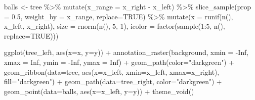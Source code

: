 \documentclass[
]{book}
\newenvironment{Shaded}{\begin{snugshade}}{\end{snugshade}}
\newcommand{\AttributeTok}[1]{\textcolor[rgb]{0.77,0.63,0.00}{#1}}
\newcommand{\ConstantTok}[1]{\textcolor[rgb]{0.00,0.00,0.00}{#1}}
\newcommand{\DecValTok}[1]{\textcolor[rgb]{0.00,0.00,0.81}{#1}}
\newcommand{\FloatTok}[1]{\textcolor[rgb]{0.00,0.00,0.81}{#1}}
\newcommand{\FunctionTok}[1]{\textcolor[rgb]{0.00,0.00,0.00}{#1}}
\newcommand{\NormalTok}[1]{#1}
\newcommand{\OtherTok}[1]{\textcolor[rgb]{0.56,0.35,0.01}{#1}}
\newcommand{\SpecialCharTok}[1]{\textcolor[rgb]{0.00,0.00,0.00}{#1}}
\newcommand{\StringTok}[1]{\textcolor[rgb]{0.31,0.60,0.02}{#1}}
\begin{document}
\begin{Shaded}
\begin{Highlighting}[]
\NormalTok{balls }\OtherTok{\textless{}{-}} 
\NormalTok{  tree }\SpecialCharTok{\%\textgreater{}\%}
  \FunctionTok{mutate}\NormalTok{(}\AttributeTok{x\_range =}\NormalTok{ x\_right }\SpecialCharTok{{-}}\NormalTok{ x\_left) }\SpecialCharTok{\%\textgreater{}\%}
  \FunctionTok{slice\_sample}\NormalTok{(}\AttributeTok{prop =} \FloatTok{0.5}\NormalTok{, }\AttributeTok{weight\_by =}\NormalTok{ x\_range, }\AttributeTok{replace=}\ConstantTok{TRUE}\NormalTok{) }\SpecialCharTok{\%\textgreater{}\%}
  \FunctionTok{mutate}\NormalTok{(}\AttributeTok{x =} \FunctionTok{runif}\NormalTok{(}\FunctionTok{n}\NormalTok{(), x\_left, x\_right),}
         \AttributeTok{size =} \FunctionTok{rnorm}\NormalTok{(}\FunctionTok{n}\NormalTok{(), }\DecValTok{5}\NormalTok{, }\DecValTok{1}\NormalTok{),}
         \AttributeTok{icolor =} \FunctionTok{factor}\NormalTok{(}\FunctionTok{sample}\NormalTok{(}\DecValTok{1}\SpecialCharTok{:}\DecValTok{5}\NormalTok{, }\FunctionTok{n}\NormalTok{(), }\AttributeTok{replace=}\ConstantTok{TRUE}\NormalTok{)))}

\FunctionTok{ggplot}\NormalTok{(tree\_left, }\FunctionTok{aes}\NormalTok{(}\AttributeTok{x=}\NormalTok{x, }\AttributeTok{y=}\NormalTok{y)) }\SpecialCharTok{+} 
  \FunctionTok{annotation\_raster}\NormalTok{(background,}
                    \AttributeTok{xmin =} \SpecialCharTok{{-}}\ConstantTok{Inf}\NormalTok{, }\AttributeTok{xmax =} \ConstantTok{Inf}\NormalTok{,}
                    \AttributeTok{ymin =} \SpecialCharTok{{-}}\ConstantTok{Inf}\NormalTok{, }\AttributeTok{ymax =} \ConstantTok{Inf}\NormalTok{) }\SpecialCharTok{+}
  \FunctionTok{geom\_path}\NormalTok{(}\AttributeTok{color=}\StringTok{"darkgreen"}\NormalTok{) }\SpecialCharTok{+}
  \FunctionTok{geom\_ribbon}\NormalTok{(}\AttributeTok{data=}\NormalTok{tree, }\FunctionTok{aes}\NormalTok{(}\AttributeTok{x=}\NormalTok{x\_left, }\AttributeTok{xmin=}\NormalTok{x\_left, }\AttributeTok{xmax=}\NormalTok{x\_right), }\AttributeTok{fill=}\StringTok{"darkgreen"}\NormalTok{) }\SpecialCharTok{+}
  \FunctionTok{geom\_path}\NormalTok{(}\AttributeTok{data=}\NormalTok{tree\_right, }\AttributeTok{color=}\StringTok{"darkgreen"}\NormalTok{) }\SpecialCharTok{+}
  \FunctionTok{geom\_point}\NormalTok{(}\AttributeTok{data=}\NormalTok{balls, }\FunctionTok{aes}\NormalTok{(}\AttributeTok{x=}\NormalTok{x\_left, }\AttributeTok{y=}\NormalTok{y)) }\SpecialCharTok{+}
  \FunctionTok{theme\_void}\NormalTok{()}
\end{Highlighting}
\end{Shaded}
\end{document}

